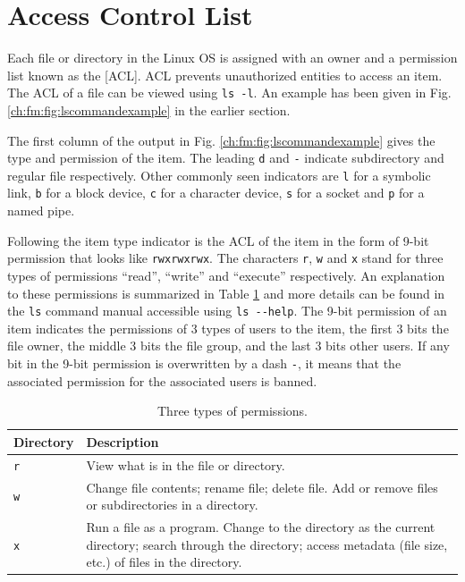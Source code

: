 \section{Access Control List} \label{ch:fm:sec:accesscontrollist}

Each file or directory in the Linux OS is assigned with an owner and a permission list known as the [ACL]. ACL prevents unauthorized entities to access an item. The ACL of a file can be viewed using \verb|ls -l|. An example has been given in Fig. \ref{ch:fm:fig:lscommandexample} in the earlier section.

The first column of the output in Fig. \ref{ch:fm:fig:lscommandexample} gives the type and permission of the item. The leading \verb|d| and \verb|-| indicate subdirectory and regular file respectively. Other commonly seen indicators are \verb|l| for a symbolic link, \verb|b| for a block device, \verb|c| for a character device, \verb|s| for a socket and \verb|p| for a named pipe.

Following the item type indicator is the ACL of the item in the form of 9-bit permission that looks like \verb|rwxrwxrwx|. The characters \verb|r|, \verb|w| and \verb|x| stand for three types of permissions ``read'', ``write'' and ``execute'' respectively. An explanation to these permissions is summarized in Table \ref{ch:fm:tab:threepermissions} and more details can be found in the \verb|ls| command manual accessible using \verb|ls --help|. The 9-bit permission of an item indicates the permissions of 3 types of users to the item, the first 3 bits the file owner, the middle 3 bits the file group, and the last 3 bits other users. If any bit in the 9-bit permission is overwritten by a dash \verb|-|, it means that the associated permission for the associated users is banned.

\begin{table}
  \centering \caption{Three types of permissions.}\label{ch:fm:tab:threepermissions}
  \begin{tabularx}{\textwidth}{lX}
    \hline
    Directory & Description \\ \hline
    \verb|r| & View what is in the file or directory. \\ 
    \verb|w| & Change file contents; rename file; delete file. Add or remove files or subdirectories in a directory. \\ 
    \verb|x| & Run a file as a program. Change to the directory as the current directory; search through the directory; access metadata (file size, etc.) of files in the directory. \\
    \hline
  \end{tabularx}
\end{table}

